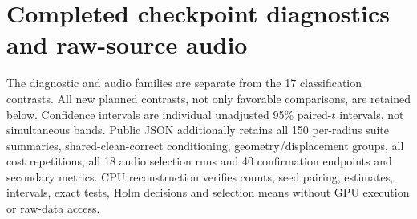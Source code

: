 \documentclass[10pt,a4paper,twocolumn]{article}
\begin{document}
\section{Completed checkpoint diagnostics and raw-source audio}
\label{app:completed_followups}

The diagnostic and audio families are separate from the 17 classification
contrasts. All new planned contrasts, not only favorable comparisons,
are retained below. Confidence intervals are individual unadjusted 95\%
paired-$t$ intervals, not simultaneous bands. Public JSON additionally
retains all 150 per-radius suite summaries, shared-clean-correct
conditioning, geometry/displacement groups, all cost repetitions, all
18 audio selection runs and 40 confirmation endpoints and secondary
metrics. CPU reconstruction verifies counts, seed pairing, estimates,
intervals, exact tests, Holm decisions and selection means without
GPU execution or raw-data access.
\end{document}
